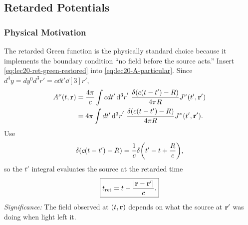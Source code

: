 
\subsection{Retarded Potentials}\label{subsec:lec20-retarded-potentials}

\subsubsection*{Physical Motivation}
The retarded Green function is the physically standard choice because it implements the
boundary condition ``no field before the source acts.'' Insert
\eqref{eq:lec20-ret-green-restored} into \eqref{eq:lec20-A-particular}. Since
$d^4y=dy^0d^3r'=c\dd{t}'\dd[3]{r}'$,
\begin{align*}
  A^\nu(t,\mathbf{r})
  &=\frac{4\pi}{c}\int cdt'\dd[3]{r}'\,
    \frac{\delta\qty(c(t-t')-R)}{4\pi R}J^\nu(t',\mathbf{r}') \\
  &=4\pi\int dt'\dd[3]{r}'\,
    \frac{\delta\qty(c(t-t')-R)}{4\pi R}J^\nu(t',\mathbf{r}').
\end{align*}
Use
\begin{equation*}
  \delta\qty(c(t-t')-R)=\frac{1}{c}\delta\qty(t'-t+\frac{R}{c}),
\end{equation*}
so the $t'$ integral evaluates the source at the retarded time
\begin{equation}\label{eq:lec20-retarded-time}
  \boxed{t_{\rm ret}=t-\frac{|\mathbf{r}-\mathbf{r}'|}{c}.}
\end{equation}
\textit{Significance:} The field observed at $(t,\mathbf{r})$ depends on what the source at $\mathbf{r}'$ was doing when light left it.

